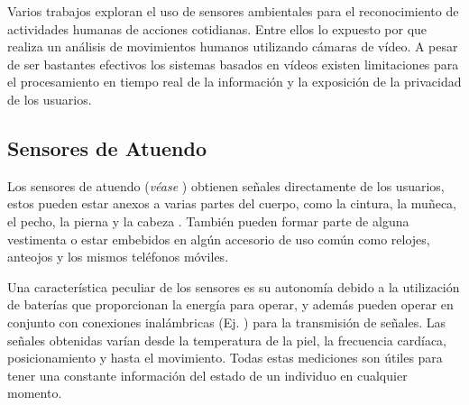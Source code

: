 Varios trabajos exploran el uso de sensores ambientales para el reconocimiento
de actividades humanas de acciones cotidianas. Entre ellos lo expuesto
por \cite{Poppe2007} que realiza un análisis de movimientos humanos
utilizando cámaras de vídeo. A pesar de ser bastantes efectivos los
sistemas basados en vídeos existen limitaciones para el procesamiento
en tiempo real de la información y la exposición de la privacidad
de los usuarios.

\subsection{Sensores de Atuendo}

Los sensores de atuendo (\emph{véase }) obtienen
señales directamente de los usuarios, estos pueden estar anexos a
varias partes del cuerpo, como la cintura, la muñeca, el pecho, la
pierna y la cabeza \cite{Bao2004}. También pueden formar parte de
alguna vestimenta o estar embebidos en algún accesorio de uso común
como relojes, anteojos y los mismos teléfonos móviles. 

Una característica peculiar de los sensores es su autonomía debido
a la utilización de baterías que proporcionan la energía para operar,
y además pueden operar en conjunto con conexiones inalámbricas (Ej.
) para la transmisión de señales. Las señales obtenidas
varían desde la temperatura de la piel, la frecuencia cardíaca, posicionamiento
y hasta el movimiento. Todas estas mediciones son útiles para tener
una constante información del estado de un individuo en cualquier
momento.

